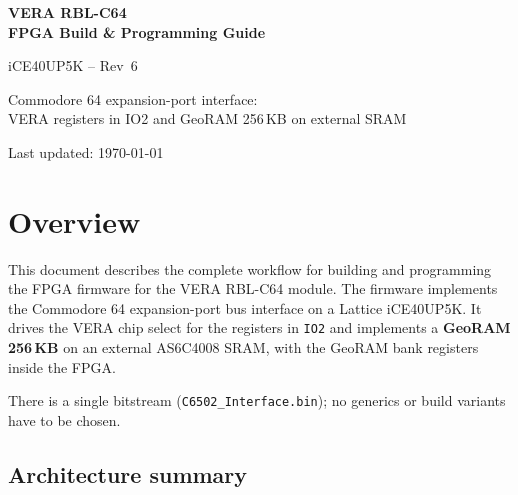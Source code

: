 \documentclass[11pt,a4paper]{article}
\newcommand{\sig}[1]{\texttt{#1}}
\newcommand{\file}[1]{\texttt{#1}}
\begin{document}

\begin{titlepage}
    \centering
    \vspace*{30mm}
    {\Huge\bfseries VERA RBL-C64\\[4mm]
     FPGA Build \& Programming Guide\par}
    \vspace{10mm}
    {\large iCE40UP5K -- Rev~6\par}
    \vspace{8mm}
    {\normalsize
        Commodore 64 expansion-port interface:\\
        VERA registers in IO2 and GeoRAM 256\,KB on external SRAM\par}
    \vfill
    {\small Last updated: \today\par}
\end{titlepage}

\tableofcontents
\newpage

\section{Overview}

This document describes the complete workflow for building and programming
the FPGA firmware for the VERA RBL-C64 module.  The firmware implements the
Commodore 64 expansion-port bus interface on a Lattice iCE40UP5K\@.  It drives
the VERA chip select for the registers in \sig{IO2} and implements a
\textbf{GeoRAM 256\,KB} on an external AS6C4008 SRAM, with the GeoRAM bank
registers inside the FPGA.

There is a single bitstream (\file{C6502\_Interface.bin}); no generics or
build variants have to be chosen.

\subsection{Architecture summary}
\end{document}
